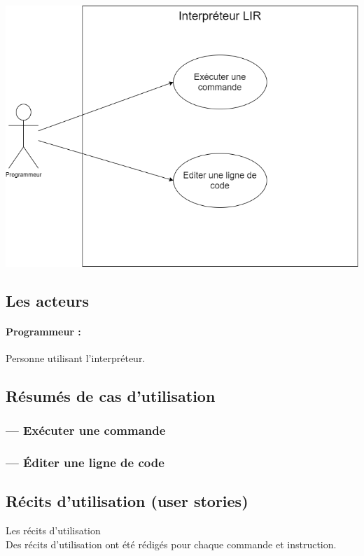 \includegraphics[width=\linewidth]{./img/DiagrammeCasUtilisation.png}

\subsection{Les acteurs}
\paragraph{Programmeur :} %
Personne utilisant l'interpréteur.

\subsection{Résumés de cas d'utilisation}
\subsubsection{\Large --- Exécuter une commande}



\subsubsection{\Large --- Éditer une ligne de code}



\subsection{Récits d'utilisation (user stories)}
Les récits d'utilisation %
\\Des récits d'utilisation ont été rédigés pour chaque commande et instruction.

